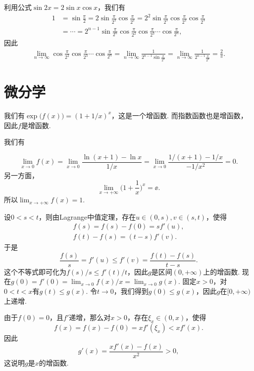 \begin{ans}
  利用公式$\sin2x=2\sin x\cos x$，我们有
  \begin{align*}
    1 & = \sin\frac\pi2 = 2\sin\frac\pi{2^2}
    \cos\frac\pi{2^2}
    = 2^2\sin\frac\pi{2^3}\cos\frac\pi{2^2}\cos\frac\pi{2^3}\\
    & = \cdots = 2^{n-1}\sin\frac\pi{2^n}
    \cos\frac\pi{2^2}\cos\frac\pi{2^3}\cdots\cos\frac\pi{2^n},
  \end{align*}
  因此
  \begin{align*}
    \lim_{n\to\infty}\cos\frac\pi{2^2}\cos
  \frac\pi{2^3}\cdots\cos\frac\pi{2^n}
  =\lim_{n\to\infty} \frac1{2^{n-1}\sin\frac\pi{2^n}}
  =\lim_{n\to\infty} \frac1{2^{n-1}\frac\pi{2^n}}=\frac2\pi.
  \end{align*}
\end{ans}

\section{微分学}
\begin{ans}
  \begin{enumb}
    \item 我们有$\exp\big(f(x)\big)=(1+1/x)^x$，这是一个增函数. 而指数函数也是增函数，因此$f$是增函数.
    \item 我们有
  \end{enumb}
  \[
    \lim_{x\to0}f(x)=\lim_{x\to0}\frac{\ln(x+1)-\ln x}{1/x}
    =\lim_{x\to0}\frac{1/(x+1)-1/x}{-1/x^2} = 0.
  \]
  另一方面，
  \[ \lim_{x\to+\infty}\Big(1+\frac1x\Big)^x = \ee. \]
  所以$\lim_{x\to+\infty}f(x)=1$.
\end{ans}

\begin{ans}
  \method 设$0<s<t$，则由Lagrange中值定理，存在$u\in(0,s),v\in(s,t)$，使得
  \begin{gather*}
    f(s) = f(s) - f(0) = sf'(u),\\
    f(t) - f(s) = (t-s)f'(v).
  \end{gather*}
  于是
  \[
    \frac{f(s)}s = f'(u) \le f'(v) = \frac{f(t)-f(s)}{t-s}.
  \]
  这个不等式即可化为$f(s)/s\le f'(t)/t$，因此$g$是区间$(0,+\infty)$上的增函数. 现在$g(0)=f'(0)=\lim_{x\to0}f(x)/x=\lim_{x\to0}g(x)$. 固定$x>0$，对$0<t<x$有$g(t)\le g(x)$. 令$t\to0$，我们得到$g(0)\le g(x)$，因此$g$在$[0,+\infty)$上递增.

  \method 由于$f(0)=0$，且$f'$递增，那么对$x>0$，存在$\xi_x\in(0,x)$，使得
  \[ f(x)=f(x)-f(0)=xf'(\xi_x)<xf'(x). \]
  因此
  \[ g'(x) = \frac{xf'(x)-f(x)}{x^2}>0, \]
  这说明$g$是$x$的增函数.
\end{ans}

